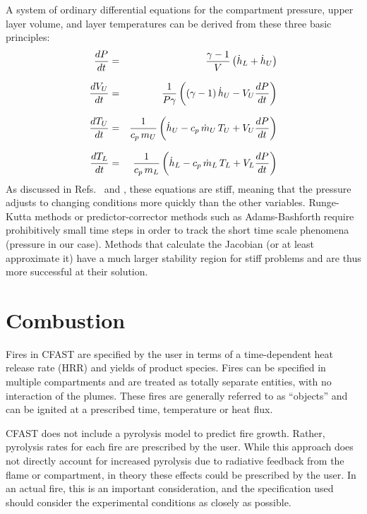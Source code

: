 \ee
A system of ordinary differential equations for the compartment pressure, upper layer volume, and layer temperatures can be derived from these three basic principles:
\begin{eqnarray}
\frac{d {P}}{dt} &=& \frac{{\gamma-1}}{{V}} \left( \dot h_L + \dot h_U \right)  \\[.1in]
\frac{d {V_U}}{dt} &=& \frac{1}{P \gamma} \left( (\gamma-1) \, \dot h_U - V_U \frac{d {P}}{dt} \right) \\[.1in]
\frac{d {T_U}}{dt} &=& \frac{1}{c_p \, m_U} \left( \dot h_U - c_p \, \dot m_U \, T_U + V_U \frac{d {P}}{dt} \right) \\[.1in]
\frac{d {T_L}}{dt} &=& \frac{1}{c_p \, m_L} \left( \dot h_L - c_p \, \dot m_L \, T_L + V_L \frac{d {P}}{dt} \right)
\end{eqnarray}
As discussed in Refs.~\cite{Forney:1994} and \cite{Rehm:1992}, these equations are stiff, meaning that the pressure adjusts to changing conditions more quickly than the other variables. Runge-Kutta methods or predictor-corrector methods such as Adams-Bashforth require prohibitively small time steps in order to track the short time scale phenomena (pressure in our case). Methods that calculate the Jacobian (or at least approximate it) have a much larger stability region for stiff problems and are thus more successful at their solution.





\chapter{Combustion}
\label{sec:TheFire}

Fires in CFAST are specified by the user in terms of a time-dependent heat release rate (HRR) and yields of product species. Fires can be specified in multiple compartments and are treated as totally separate entities, with no interaction of the plumes. These fires are generally referred to as ``objects'' and can be ignited at a prescribed time, temperature or heat flux.

CFAST does not include a pyrolysis model to predict fire growth. Rather, pyrolysis rates for each fire are prescribed by the user. While this approach does not directly account for increased pyrolysis due to radiative feedback from the flame or compartment, in theory these effects could be prescribed by the user. In an actual fire, this is an important consideration, and the specification used should consider the experimental conditions as closely as possible.

